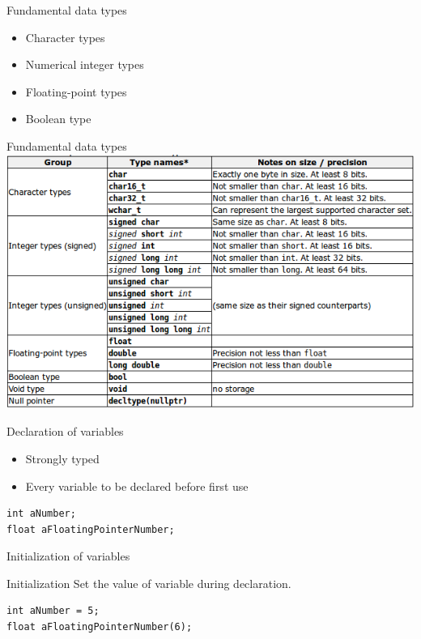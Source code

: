 \documentclass{beamer}
\begin{document}
\begin{frame}{Fundamental data types}
\begin{itemize}
  \item Character types
  \item Numerical integer types
  \item Floating-point types
  \item Boolean type
\end{itemize}
\end{frame}

\begin{frame}{Fundamental data types}
\includegraphics[scale=0.48]{img/FundamentalTypes.png}
\end{frame}

\begin{frame}[fragile]{Declaration of variables}
\begin{itemize}
  \item Strongly typed
  \item Every variable to be declared before first use
\end{itemize}
\begin{lstlisting}[caption=Variable declaration]
int aNumber;
float aFloatingPointerNumber;
\end{lstlisting}
\end{frame}

\begin{frame}[fragile]{Initialization of variables}
\begin{definition}{Initialization}
   Set the value of variable during declaration. 
\end{definition}
\begin{lstlisting}[caption=Variable initialization]
int aNumber = 5;
float aFloatingPointerNumber(6);
\end{lstlisting}
\end{frame}
\end{document}
